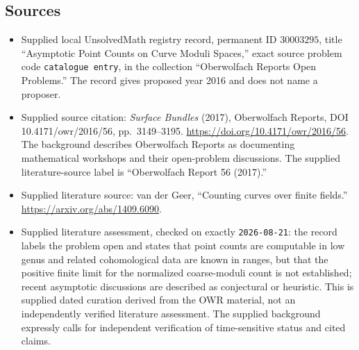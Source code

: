 \documentclass[11pt]{article}
\begin{document}
\subsection{Sources}
\begin{itemize}
\item Supplied local UnsolvedMath registry record, permanent ID \(30003295\), title ``Asymptotic Point Counts on Curve Moduli Spaces,'' exact source problem code \texttt{catalogue entry}, in the collection ``Oberwolfach Reports Open Problems.'' The record gives proposed year 2016 and does not name a proposer.
\item Supplied source citation: \emph{Surface Bundles} (2017), Oberwolfach Reports, DOI 10.4171/owr/2016/56, pp.\ 3149--3195. \url{https://doi.org/10.4171/owr/2016/56}. The background describes Oberwolfach Reports as documenting mathematical workshops and their open-problem discussions. The supplied literature-source label is ``Oberwolfach Report 56 (2017).''
\item Supplied literature source: van der Geer, ``Counting curves over finite fields.'' \url{https://arxiv.org/abs/1409.6090}.
\item Supplied literature assessment, checked on exactly \texttt{2026-08-21}: the record labels the problem open and states that point counts are computable in low genus and related cohomological data are known in ranges, but that the positive finite limit for the normalized coarse-moduli count is not established; recent asymptotic discussions are described as conjectural or heuristic. This is supplied dated curation derived from the OWR material, not an independently verified literature assessment. The supplied background expressly calls for independent verification of time-sensitive status and cited claims.
\end{itemize}
\end{document}
